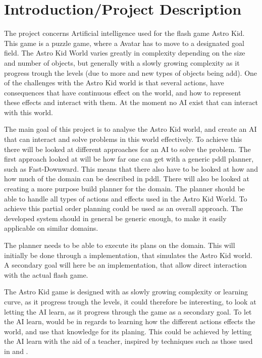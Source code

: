 \section{Introduction/Project Description}

The project concerns Artificial intelligence used for the flash game Astro Kid. This game is a puzzle game, where a Avatar has to move to a designated goal field. The Astro Kid World varies greatly in complexity depending on the size and number of objects, but generally with a slowly growing complexity as it progress trough the levels (due to more and new types of objects being add). One of the challenges with the Astro Kid world is that several actions, have consequences that have continuous effect on the world, and how to represent these effects and interact with them. At the moment no AI exist that can interact with this world. 

The main goal of this project is to analyse the Astro Kid world, and create an AI that can interact and solve problems in this world effectively. To achieve this there will be looked at different approaches for an AI to solve the problem. The first approach looked at will be how far one can get with a generic \gls{pddl} planner, such as Fast-Downward. This means that there also have to be looked at how and how much of the domain can be described in \gls{pddl}. There will also be looked at creating a more purpose build planner for the domain. The planner should be able to handle all types of actions and effects used in the Astro Kid World. To achieve this partial order planning could be used as an overall approach. The developed system should in general be generic enough, to make it easily applicable on similar domains. 

The planner needs to be able to execute its plans on the domain. This will initially be done through a implementation, that simulates the Astro Kid world. A secondary goal will here be an implementation, that allow direct interaction with the actual flash game. 

The Astro Kid game is designed with as slowly growing complexity or learning curve, as it progress trough the levels, it could therefore be interesting, to look at letting the AI learn, as it progress through the game as a secondary goal. To let the AI learn, would be in regards to learning how the different actions effects the world, and use that knowledge for its planing. This could be achieved by letting the AI learn with the aid of a teacher, inspired by techniques such as those used in \cite{Action-Schemas} and \cite{trail}.

